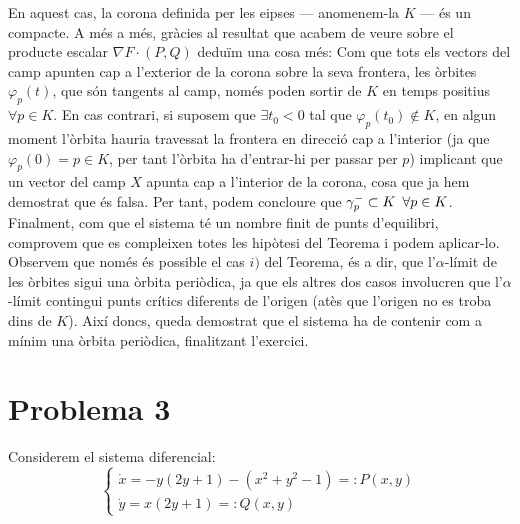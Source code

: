 \documentclass[10pt,a4paper]{article}
\begin{document}
\noindent En aquest cas, la corona definida per les e\lgem ipses --- anomenem-la $K$ --- és un compacte. A més a més, gràcies al resultat que acabem de veure sobre el producte escalar $\nabla F\cdot(P,Q)$ deduïm una cosa més: Com que tots els vectors del camp apunten cap a l'exterior de la corona sobre la seva frontera, les òrbites $\varphi_p(t)$, que són tangents al camp, només poden sortir de $K$ en temps positius $\forall p \in K$. En cas contrari, si suposem que $\exists t_0<0$ tal que $\varphi_p(t_0)\notin K$, en algun moment l'òrbita hauria travessat la frontera en direcció cap a l'interior (ja que $\varphi_p(0)=p\in K$, per tant l'òrbita ha d'entrar-hi per passar per $p$) implicant que un vector del camp $X$ apunta cap a l'interior de la corona, cosa que ja hem demostrat que és falsa. Per tant, podem concloure que $\gamma_p^{-}\subset K\enskip\forall p\in K$. Finalment, com que el sistema té un nombre finit de punts d'equilibri, comprovem que es compleixen totes les hipòtesi del Teorema i podem aplicar-lo.
\\Observem que només és possible el cas $i)$ del Teorema, és a dir, que l'$\alpha$-límit de les òrbites sigui una òrbita periòdica, ja que els altres dos casos involucren que l'$\alpha$-límit contingui punts crítics diferents de l'origen (atès que l'origen no es troba dins de $K$). Així doncs, queda demostrat que el sistema ha de contenir com a mínim una òrbita periòdica, finalitzant l'exercici.



\newpage
\section*{Problema 3}
Considerem el sistema diferencial:
\begin{equation}
  \begin{cases}
    \dot{x}=-y(2y+1)-(x^2+y^2-1)=:P(x,y) \\
    \dot{y}=x(2y+1) =:Q(x,y)
  \end{cases}
\end{equation}
\end{document}
